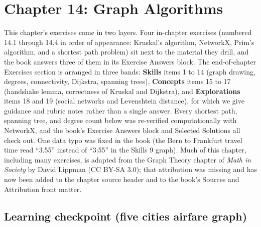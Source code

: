
\section{Chapter 14: Graph Algorithms}

This chapter's exercises come in two layers. Four in-chapter exercises (numbered 14.1 through 14.4 in order of appearance: Kruskal's algorithm, NetworkX, Prim's algorithm, and a shortest path problem) sit next to the material they drill, and the book answers three of them in its Exercise Answers block. The end-of-chapter Exercises section is arranged in three bands: \textbf{Skills} items 1 to 14 (graph drawing, degrees, connectivity, Dijkstra, spanning trees), \textbf{Concepts} items 15 to 17 (handshake lemma, correctness of Kruskal and Dijkstra), and \textbf{Explorations} items 18 and 19 (social networks and Levenshtein distance), for which we give guidance and rubric notes rather than a single answer. Every shortest path, spanning tree, and degree count below was re-verified computationally with NetworkX, and the book's Exercise Answers block and Selected Solutions all check out. One data typo was fixed in the book (the Bern to Frankfurt travel time read ``3.55'' instead of ``3:55'' in the Skills 9 graph). Much of this chapter, including many exercises, is adapted from the Graph Theory chapter of \emph{Math in Society} by David Lippman (CC BY-SA 3.0); that attribution was missing and has now been added to the chapter source header and to the book's Sources and Attribution front matter.

\subsection*{Learning checkpoint (five cities airfare graph)}

